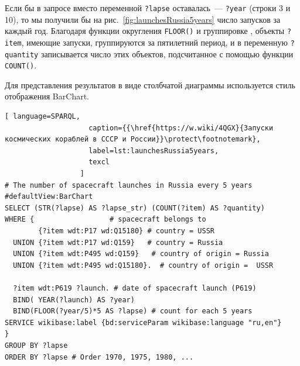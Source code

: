 Если бы в запросе вместо переменной \lstinline|?lapse| оставалась~--- \lstinline|?year| (строки 3 и 10), 
то мы получили бы на рис.~\ref{fig:launchesRussia5years} 
число запусков за каждый год. 
Благодаря функции округления \lstinline|FLOOR()|
и группировке%
, 
объекты \lstinline|?item|, имеющие запуски, группируются за пятилетний период, 
и в переменную \lstinline|?quantity| записывается число этих объектов, 
подсчитанное с помощью функции \lstinline|COUNT()|.

Для представления результатов в виде столбчатой диаграммы используется стиль отображения BarChart.

\label{question:spacecraft_1}

\begin{lstlisting}[ language=SPARQL, 
                    caption={{\href{https://w.wiki/4QGX}{Запуски космических кораблей в СССР и России}}\protect\footnotemark}, 
                    label=lst:launchesRussia5years,
                    texcl
                  ]
# The number of spacecraft launches in Russia every 5 years
#defaultView:BarChart
SELECT (STR(?lapse) AS ?lapse_str) (COUNT(?item) AS ?quantity)
WHERE {                  # spacecraft belongs to
        {?item wdt:P17 wd:Q15180} # country = USSR
  UNION {?item wdt:P17 wd:Q159}   # country = Russia
  UNION {?item wdt:P495 wd:Q159}   # country of origin = Russia
  UNION {?item wdt:P495 wd:Q15180}.  # country of origin =  USSR
  
  ?item wdt:P619 ?launch. # date of spacecraft launch (P619)
  BIND( YEAR(?launch) AS ?year) 
  BIND(FLOOR(?year/5)*5 AS ?lapse) # count for each 5 years
SERVICE wikibase:label {bd:serviceParam wikibase:language "ru,en"}
} 
GROUP BY ?lapse
ORDER BY ?lapse # Order 1970, 1975, 1980, ...
\end{lstlisting}

